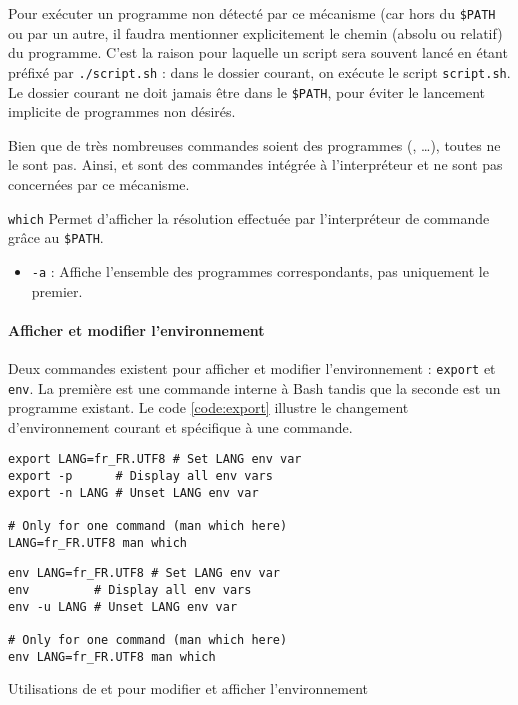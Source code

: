 Pour exécuter un programme non détecté par ce mécanisme (car hors du \texttt{\$PATH} ou  par un autre, il faudra mentionner explicitement le chemin (absolu ou relatif) du programme. C'est la raison pour laquelle un script sera souvent lancé en étant préfixé par \texttt{./script.sh} : dans le dossier courant, on exécute le script \texttt{script.sh}. Le dossier courant ne doit jamais être dans le \texttt{\$PATH}, pour éviter le lancement implicite de programmes non désirés.

 Bien que de très nombreuses commandes soient des programmes (, \dots), toutes ne le sont pas. Ainsi,  et  sont des commandes intégrée à l'interpréteur et ne sont pas concernées par ce mécanisme.

\texttt{which} 
Permet d'afficher la résolution effectuée par l'interpréteur de commande grâce au \texttt{\$PATH}.
\begin{itemize}
    \item \texttt{-a} : Affiche l'ensemble des programmes correspondants, pas uniquement le premier.
\end{itemize}

\paragraph{Afficher et modifier l'environnement}
Deux commandes existent pour afficher et modifier l'environnement : \texttt{export} et \texttt{env}. La première est une commande interne à Bash tandis que la seconde est un programme existant. Le code \ref{code:export} illustre le changement d'environnement courant et spécifique à une commande.
\vspace{3mm}
\begin{code}
    \centering
    \noindent\begin{minipage}{.475\textwidth}
    \begin{verbatim}
export LANG=fr_FR.UTF8 # Set LANG env var
export -p      # Display all env vars
export -n LANG # Unset LANG env var

# Only for one command (man which here)
LANG=fr_FR.UTF8 man which
\end{verbatim}
\end{minipage}\hfill
\begin{minipage}{.475\textwidth}
\begin{verbatim}
env LANG=fr_FR.UTF8 # Set LANG env var
env         # Display all env vars
env -u LANG # Unset LANG env var

# Only for one command (man which here)
env LANG=fr_FR.UTF8 man which
\end{verbatim}
\end{minipage}\hfill
    \caption{Utilisations de  et  pour modifier et afficher l'environnement}
    \label{code:export}
\end{code}

